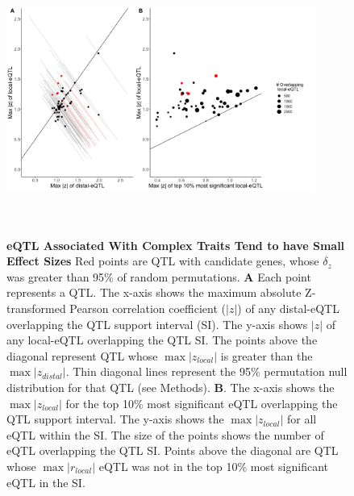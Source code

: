 \documentclass[article,9pt,twocolumn,twoside]{rilabRxiv}
\begin{document}
\begin{figure}[!ht]
\centering
\includegraphics[width=0.9\textwidth,height=3.5in]{figures/chapter2_figure3_v2.png}
\caption{\textbf{eQTL Associated With Complex Traits Tend to have Small Effect Sizes}
Red points are QTL with candidate genes, whose $\delta_{z}$ was greater than 95\% of random permutations. \textbf{A} Each point represents a QTL. The x-axis shows the maximum absolute Z-transformed Pearson correlation coefficient ($|z|$) of any distal-eQTL overlapping the QTL support interval (SI). The y-axis shows $|z|$ of any local-eQTL overlapping the QTL SI. The points above the diagonal represent QTL whose $\max {|z_{local}|}$ is greater than the $\max {|z_{distal}|}$. Thin diagonal lines represent the 95\% permutation null distribution for that QTL (see Methods). \textbf{B}. The x-axis shows the $\max {|z_{local}|}$ for the top 10\% most significant eQTL overlapping the QTL support interval. The y-axis shows the $\max {|z_{local}|}$ for all eQTL within the SI. The size of the points shows the number of eQTL overlapping the QTL SI. Points above the diagonal are QTL whose $\max {|r_{local}|}$ eQTL was not in the top 10\% most significant eQTL in the SI.}
\label{fig:candidates}
\end{figure}
\end{document}
